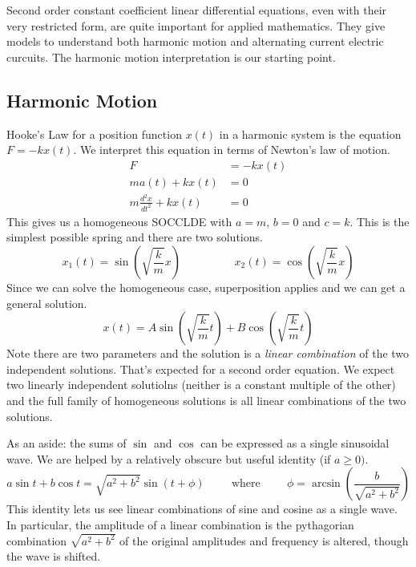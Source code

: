 \documentclass[fleqn,letterpaper]{report}
\begin{document}
Second order constant coefficient linear differential
equations, even with their very restricted form, are quite
important for applied mathematics. They give models to
understand both harmonic motion and alternating current
electric curcuits. The harmonic motion interpretation is our
starting point. 

\subsection{Harmonic Motion}
\label{harmonic-motion}

Hooke's Law for a position function $x(t)$ in a harmonic
system is the equation $F = -kx(t)$. We interpret this
equation in terms of Newton's law of motion.
\begin{align*}
F & = -k x(t) \\
m a(t) + k x(t) & = 0 \\
m\frac{d^2 x}{dt^2} + k x(t) & = 0 
\end{align*}
This gives us a homogeneous SOCCLDE with $a=m$, $b=0$ and $c=k$.
This is the simplest possible spring and there are two
solutions.
\begin{equation*}
x_1(t) = \sin \left( \sqrt{\frac{k}{m}} x \right) \hspace{2cm}
x_2(t) = \cos \left( \sqrt{\frac{k}{m}} x \right) 
\end{equation*}
Since we can solve the homogeneous case, superposition applies
and we can get a general solution.
\begin{equation*}
x(t) = A \sin \left( \sqrt{\frac{k}{m}} t \right) +
B \cos \left( \sqrt{\frac{k}{m}} t \right) 
\end{equation*}
Note there are two parameters and the solution is a
\emph{linear combination} of the two independent solutions. 
That's expected for a second order equation. We expect two
linearly independent solutiolns (neither is a constant multiple
of the other) and the full family of homogeneous solutions is
all linear combinations of the two solutions. 

As an aside: the sums of $\sin$ and $\cos$ can be expressed
as a single sinusoidal wave. We are helped by a relatively
obscure but useful identity (if $a \geq 0)$.
\begin{equation*}
a \sin t + b \cos t = \sqrt{a^2+b^2} \sin (t + \phi)
\hspace{1cm} \text{where} \hspace{1cm} 
\phi = \arcsin \left( \frac{b}{\sqrt{a^2+b^2}} \right)
\end{equation*}
This identity lets us see linear combinations of sine and
cosine as a single wave. In particular, the amplitude of a
linear combination is the pythagorian combination
$\sqrt{a^2+b^2}$ of the original amplitudes and frequency is
altered, though the wave is shifted.
\end{document}
